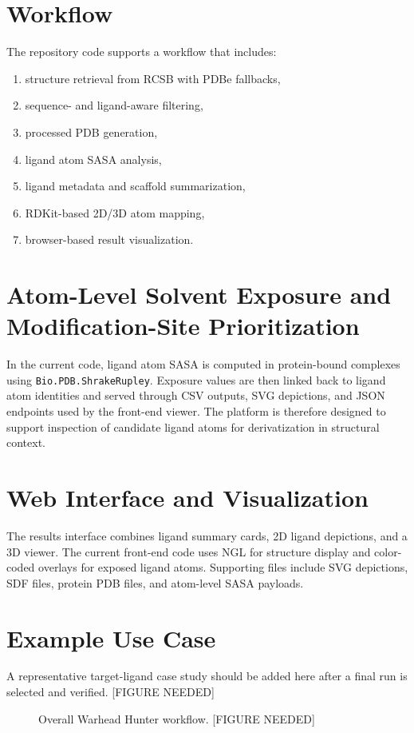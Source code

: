 \documentclass[11pt]{article}
\begin{document}
\section{Workflow}
The repository code supports a workflow that includes:
\begin{enumerate}[leftmargin=*]
  \item structure retrieval from RCSB with PDBe fallbacks,
  \item sequence- and ligand-aware filtering,
  \item processed PDB generation,
  \item ligand atom SASA analysis,
  \item ligand metadata and scaffold summarization,
  \item RDKit-based 2D/3D atom mapping,
  \item browser-based result visualization.
\end{enumerate}

\section{Atom-Level Solvent Exposure and Modification-Site Prioritization}
In the current code, ligand atom SASA is computed in protein-bound complexes using \texttt{Bio.PDB.ShrakeRupley}. Exposure values are then linked back to ligand atom identities and served through CSV outputs, SVG depictions, and JSON endpoints used by the front-end viewer. The platform is therefore designed to support inspection of candidate ligand atoms for derivatization in structural context.

\section{Web Interface and Visualization}
The results interface combines ligand summary cards, 2D ligand depictions, and a 3D viewer. The current front-end code uses NGL for structure display and color-coded overlays for exposed ligand atoms. Supporting files include SVG depictions, SDF files, protein PDB files, and atom-level SASA payloads.

\section{Example Use Case}
A representative target-ligand case study should be added here after a final run is selected and verified. [FIGURE NEEDED]

\begin{figure}[htbp]
  \centering
  \caption{Overall Warhead Hunter workflow. [FIGURE NEEDED]}
  \label{fig:workflow}
\end{figure}
\end{document}
